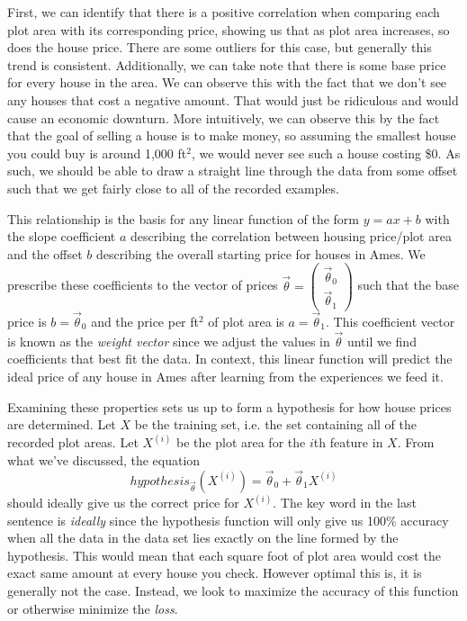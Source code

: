 First, we can identify that there is a positive correlation when comparing each
plot area with its corresponding price, showing us that as plot area increases,
so does the house price. There are some outliers for this case, but generally
this trend is consistent. Additionally, we can take note that there is some
base price for every house in the area. We can observe this with the fact that
we don't see any houses that cost a negative amount. That would just be
ridiculous and would cause an economic downturn. More intuitively, we can
observe this by the fact that the goal of selling a house is to make money, so
assuming the smallest house you could buy is around 1,000 ft$^2$, we would
never see such a house costing \$0. As such, we should be able to draw a
straight line through the data from some offset such that we get fairly close
to all of the recorded examples.

This relationship is the basis for any linear function of the form $y=ax + b$
with the slope coefficient $a$ describing the correlation between housing
price/plot area and the offset $b$ describing the overall starting price for
houses in Ames. We prescribe these coefficients to the vector of prices $\vec\theta
= \begin{pmatrix}\vec\theta_0 \\ \vec\theta_1\end{pmatrix}$ such that the base price is
$b = \vec\theta_0$ and the price per ft$^2$ of plot area is $a=\vec\theta_1$. This
coefficient vector is known as the \emph{weight vector} since we adjust the
values in $\vec\theta$ until we find coefficients that best fit the data. In
context, this linear function will predict the ideal price of any house in
Ames after learning from the experiences we feed it.

Examining these properties sets us up to form a hypothesis for how house prices
are determined. Let $X$ be the training set, i.e. the set containing all of the
recorded plot areas. Let $X^{(i)}$ be the plot area for the $i$th feature in
$X$. From what we've discussed, the equation
\begin{equation}
    hypothesis_{\vec\theta}(X^{(i)}) = \vec\theta_0 + \vec\theta_1X^{(i)}
\end{equation}
should ideally give us the correct price for $X^{(i)}$. The key word in the last
sentence is \emph{ideally} since the hypothesis function will only give us 100\%
accuracy when all the data in the data set lies exactly on the line formed by
the hypothesis. This would mean that each square foot of plot area would cost
the exact same amount at every house you check. However optimal this is, it is
generally not the case. Instead, we look to maximize the accuracy of this
function or otherwise minimize the \emph{loss}.


